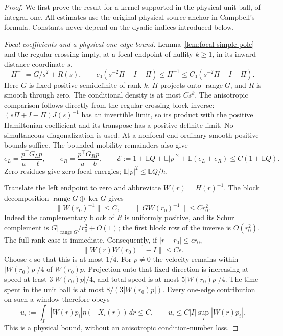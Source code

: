 \documentclass[11pt,reqno]{amsart}
\theoremstyle{definition}
\theoremstyle{remark}
\numberwithin{equation}{section}
\newcommand{\E}{\mathbb E}
\begin{document}
\begin{proof}
We first prove the result for a kernel supported in the physical unit
ball, of integral one. All estimates use the original physical source
anchor in Campbell's formula. Constants never depend on the dyadic
indices introduced below.

\emph{Focal coefficients and a physical one-edge bound.}
Lemma~\ref{lem:focal-simple-pole} and the regular crossing imply, at a
focal endpoint of nullity $k\ge1$, in its inward distance coordinate $s$,
\begin{equation}\label{eq:focal-traffic-pole}
 H^{-1}=G/s^2+R(s),\qquad
 c_0(s^{-2}\Pi+I-\Pi)\le H^{-1}
                  \le C_0(s^{-2}\Pi+I-\Pi).
\end{equation}
Here $G$ is fixed positive semidefinite of rank $k$, $\Pi$ projects
onto $\operatorname{range}G$, and $R$ is smooth through zero.
The conditional density is at most $Cs^k$.
The anisotropic comparison follows directly from the regular-crossing
block inverse: $(s\Pi+I-\Pi)J(s)^{-1}$ has an invertible limit, so its
product with the positive Hamiltonian coefficient and its transpose
has a positive definite limit. No simultaneous diagonalization is used.
At a nonfocal end ordinary smooth positive bounds suffice.
The bounded mobility remainders also give
\[
 e_L=\frac{p^\top G_Lp}{a-\ell},\qquad
 e_R=\frac{p^\top G_Rp}{u-b},\qquad
 \mathcal E:=1+\E Q+\E|p|^2+\E(e_L+e_R)\le C(1+\E Q).
\]
Zero residues give zero focal energies; $\E|p|^2\le\E Q/h$.

Translate the left endpoint to zero and abbreviate $W(r)=H(r)^{-1}$.
The block decomposition $\operatorname{range}G\oplus\ker G$ gives
\[
 \|W(r_0)^{-1}\|\le C,\qquad
 \|G W(r_0)^{-1}\|\le Cr_0^2.
\]
Indeed the complementary block of $R$ is uniformly positive, and its
Schur complement is $G|_{\operatorname{range}G}/r_0^2+O(1)$;
the first block row of the inverse is $O(r_0^2)$. The full-rank case
is immediate. Consequently, if $|r-r_0|\le\epsilon r_0$,
\[
 \|W(r)W(r_0)^{-1}-I\|\le C\epsilon.
\]
Choose $\epsilon$ so that this is at most $1/4$. For $p\ne0$ the
velocity remains within $|W(r_0)p|/4$ of $W(r_0)p$. Projection onto
that fixed direction is increasing at speed at least
$3|W(r_0)p|/4$, and total speed is at most $5|W(r_0)p|/4$.
The time spent in the unit ball is at most $8/(3|W(r_0)p|)$.
Every one-edge contribution on such a window therefore obeys
\begin{equation}\label{eq:focal-traffic-one-edge}
 u_i:=\int_I|W(r)p_i|\eta(-X_i(r))\,dr\le C,
 \qquad u_i\le C|I|\sup_I|W(r)p_i|.
\end{equation}
This is a physical bound, without an anisotropic condition-number loss.


\end{proof}
\end{document}
